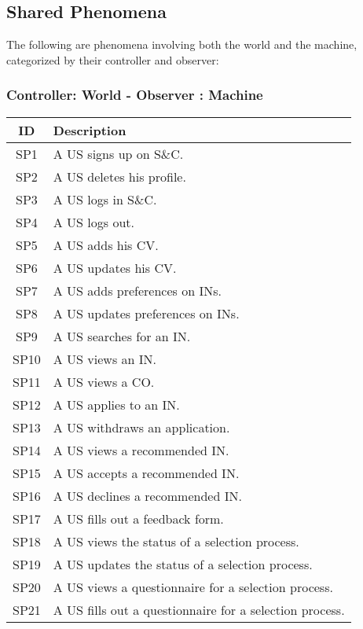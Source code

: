 \subsection{Shared Phenomena}
The following are phenomena involving both the world and the machine, categorized by their controller and observer:

\subsubsection{Controller: World - Observer : Machine}
\renewcommand{\arraystretch}{1.5}
\begin{longtable}{|c|p{10.5cm}|}
    \hline \rowcolor{polimiblue!40}
    \textbf{ID} & \textbf{Description} \\ \hline
    SP1 & A US signs up on S\&C. \\ \hline
    SP2 & A US deletes his profile.\\ \hline
    SP3 & A US logs in S\&C. \\ \hline
    SP4 & A US logs out. \\ \hline
    SP5 & A US adds his CV. \\ \hline
    SP6 & A US updates his CV. \\ \hline
    SP7 & A US adds preferences on INs. \\ \hline
    SP8 & A US updates preferences on INs. \\ \hline
    SP9 & A US searches for an IN. \\ \hline
    SP10 & A US views an IN. \\ \hline
    SP11 & A US views a CO. \\ \hline
    SP12 & A US applies to an IN. \\ \hline
    SP13 & A US withdraws an application. \\ \hline
    SP14 & A US views a recommended IN. \\ \hline
    SP15 & A US accepts a recommended IN. \\ \hline
    SP16 & A US declines a recommended IN. \\ \hline
    SP17 & A US fills out a feedback form. \\ \hline
    SP18 & A US views the status of a selection process. \\ \hline
    SP19 & A US updates the status of a selection process. \\ \hline
    SP20 & A US views a questionnaire for a selection process. \\ \hline
    SP21 & A US fills out a questionnaire for a selection process. \\ \hline

\end{longtable}
